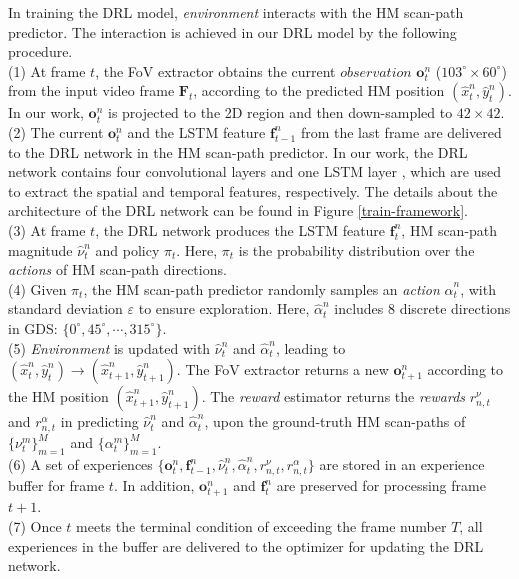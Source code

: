 \documentclass[10pt,journal,compsoc]{IEEEtran}
\begin{document}
In training the DRL model,  \textit{environment} interacts with the HM scan-path predictor.
The interaction is achieved in our DRL model by the following procedure.\\
(1) At frame $t$, the FoV extractor obtains the current $\textit{observation}$ $\mathbf{o}^n_t$ ($103^{\circ} \times 60^{\circ}$) from the input video frame $\mathbf{F}_t$, according to the predicted HM position $(\hat{x}^n_t,\hat{y}^n_t)$.
In our work, $\mathbf{o}^n_{t}$ is projected to the 2D region and then down-sampled to $42\times42$.\\
(2) The current $\mathbf{o}^n_t$ and the LSTM feature $\mathbf{f}^n_{t-1}$ from  the last frame are delivered to the DRL network in the HM scan-path predictor.
In our work, the DRL network contains four convolutional layers \cite{simonyan2014very} and one LSTM layer \cite{hochreiter1997long, hausknecht2015deep}, which are used to extract the spatial and temporal features, respectively. The details about the architecture of the DRL network can be found in Figure \ref{train-framework}.\\
(3) At frame $t$, the DRL network produces the LSTM feature $\mathbf{f}^n_{t}$, HM scan-path magnitude $\hat{\nu}^n_{t}$ and policy $\pi_{t}$. Here, $\pi_{t}$ is the probability distribution over the \textit{actions} of HM scan-path directions.\\
(4) Given $\pi_{t}$, the HM scan-path predictor randomly samples an \textit{action} $\hat{\alpha}^n_t$, with standard deviation $\varepsilon$ to ensure exploration. Here, $\hat{\alpha}^n_t$ includes 8 discrete directions in GDS: $\{ 0^{\circ}, 45^{\circ}, \cdots, 315^{\circ} \}$.\\
(5) \textit{Environment} is updated with $\hat{\nu}^n_t$ and $\hat{\alpha}^n_t$, leading to $(\hat{x}^n_t, \hat{y}^n_t)\longrightarrow (\hat{x}^n_{t+1},\hat{y}^n_{t+1})$. The FoV extractor returns a new $\mathbf{o}^n_{t+1}$ according to the HM position $(\hat{x}^n_{t+1},\hat{y}^n_{t+1})$. The \textit{reward} estimator returns the \textit{rewards} $r^{\nu}_{n,t}$ and $r^{\alpha}_{n,t}$ in predicting $\hat{\nu}^n_t$ and $\hat{\alpha}^n_t$, upon the ground-truth HM scan-paths of $\{\nu^m_t\}_{m=1}^{M}$ and $\{\alpha^m_t\}_{m=1}^{M}$. \\
(6) A set of experiences $\{ \mathbf{o}^n_{t}, \! \mathbf{f}^n_{t-1},\! \hat{\nu}^n_t,\! \hat{\alpha}^n_t,\! r^{\nu}_{n,t},\! r^{\alpha}_{n,t} \}$ are stored in an experience buffer for frame $t$.
In addition, $\mathbf{o}^n_{t+1}$ and $\mathbf{f}^n_{t}$ are preserved for processing frame $t+1$.\\
(7) Once $t$ meets the terminal condition of exceeding the frame number $T$, all experiences in the buffer are delivered to the optimizer for updating the DRL network.
\end{document}
